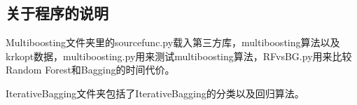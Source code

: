 \documentclass[a4paper,oneside,12pt]{article}
\begin{document}
\begin{spacing}{1.5}
\begin{appendix}
\section{关于程序的说明}
Multiboosting文件夹里的sourcefunc.py载入第三方库，multiboosting算法以及krkopt数据，multiboosting.py用来测试multiboosting算法，RFvsBG.py用来比较Random Forest和Bagging的时间代价。\par
IterativeBagging文件夹包括了IterativeBagging的分类以及回归算法。



\end{appendix}
\end{spacing}
\end{document}
